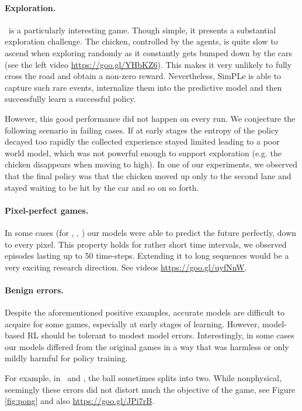 \paragraph{Exploration.}  \freeway\, is a particularly interesting game. Though simple, it presents a substantial exploration challenge. The chicken, controlled by the agents, is quite slow to ascend when exploring randomly as it constantly gets bumped down by the cars (see the left video \url{https://goo.gl/YHbKZ6}). This makes it very unlikely to fully cross the road and obtain a non-zero reward. Nevertheless, SimPLe is able to capture such rare events, internalize them into the predictive model and then successfully learn a successful policy.

However, this good performance did not happen on every run. We conjecture the following scenario in failing cases. If at early stages the entropy of the policy decayed too rapidly the collected experience stayed limited leading to a poor world model, which was not powerful enough to support exploration (e.g. the chicken disappears when moving to high). In one of our experiments, we observed that the final policy was that the chicken moved up only to the second lane and stayed waiting to be hit by the car and so on so forth. 

\paragraph{Pixel-perfect games.} In some cases (for \pong, \freeway, \breakout) our models were able to predict the future perfectly, down to every pixel. This property holds for rather short time intervals, we observed episodes lasting up to 50 time-steps. Extending it to long sequences would be a very exciting research direction. See videos \url{https://goo.gl/uyfNnW}.

\paragraph{Benign errors.} Despite the aforementioned positive examples, accurate models are difficult to acquire for some games, especially at early stages of learning. However, model-based RL should be tolerant to modest model errors. Interestingly, in some cases our models differed from the original games in a way that was harmless or only mildly harmful for policy training.

For example, in \bowling\, and \pong, the ball sometimes splits into two. While nonphysical, seemingly these errors did not distort much the objective of the game, see Figure \ref{fig:pong} and also \url{https://goo.gl/JPi7rB}.


